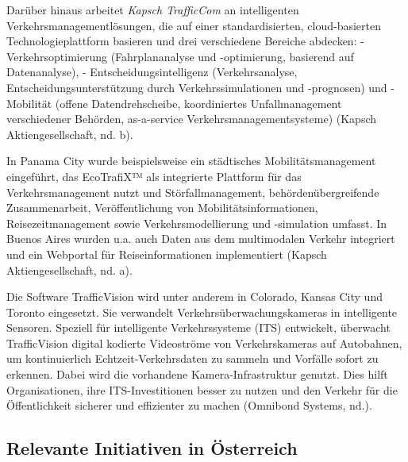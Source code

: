 \documentclass[
]{book}
\begin{document}
Darüber hinaus arbeitet \emph{Kapsch TrafficCom} an intelligenten Verkehrsmanagementlösungen, die auf einer standardisierten, cloud-basierten Technologieplattform basieren und drei verschiedene Bereiche abdecken:
- Verkehrsoptimierung (Fahrplananalyse und -optimierung, basierend auf Datenanalyse),
- Entscheidungsintelligenz (Verkehrsanalyse, Entscheidungsunterstützung durch Verkehrssimulationen und -prognosen) und
- Mobilität (offene Datendrehscheibe, koordiniertes Unfallmanagement verschiedener Behörden, as-a-service Verkehrsmanagementsysteme) (Kapsch Aktiengesellschaft, nd. b).

In Panama City wurde beispielsweise ein städtisches Mobilitätsmanagement eingeführt, das EcoTrafiX™ als integrierte Plattform für das Verkehrsmanagement nutzt und Störfallmanagement, behördenübergreifende Zusammenarbeit, Veröffentlichung von Mobilitätsinformationen, Reisezeitmanagement sowie Verkehrsmodellierung und -simulation umfasst. In Buenos Aires wurden u.a. auch Daten aus dem multimodalen Verkehr integriert und ein Webportal für Reiseinformationen implementiert (Kapsch Aktiengesellschaft, nd. a).

Die Software TrafficVision wird unter anderem in Colorado, Kansas City und Toronto eingesetzt. Sie verwandelt Verkehrsüberwachungskameras in intelligente Sensoren. Speziell für intelligente Verkehrssysteme (ITS) entwickelt, überwacht TrafficVision digital kodierte Videoströme von Verkehrskameras auf Autobahnen, um kontinuierlich Echtzeit-Verkehrsdaten zu sammeln und Vorfälle sofort zu erkennen. Dabei wird die vorhandene Kamera-Infrastruktur genutzt. Dies hilft Organisationen, ihre ITS-Investitionen besser zu nutzen und den Verkehr für die Öffentlichkeit sicherer und effizienter zu machen (Omnibond Systems, nd.).

\hypertarget{relevante-initiativen-in-uxf6sterreich-11}{%
\subsection*{Relevante Initiativen in Österreich}\label{relevante-initiativen-in-uxf6sterreich-11}}
\end{document}
